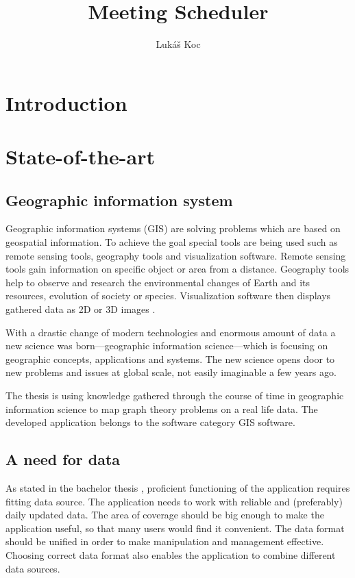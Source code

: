 \documentclass[thesis=M,english]{FITthesis}[2012/10/20]
\title{Meeting Scheduler}
\author{Luk{\' a}{\v s} Koc} %
\begin{document}

\chapter{Introduction}


\chapter{State-of-the-art}

\section{Geographic information system}
Geographic information systems (GIS) are solving problems which are based on geospatial information. To achieve the goal special tools are being used such as remote sensing tools, geography tools and visualization software. Remote sensing tools gain information on specific object or area from a distance. Geography tools help to observe and research the environmental changes of Earth and its resources, evolution of society or species. Visualization software then displays gathered data as 2D or 3D images \cite{Chen10}.

With a drastic change of modern technologies and enormous amount of data a new science was born---geographic information science---which is focusing on geographic concepts, applications and systems. The new science opens door to new problems and issues at global scale, not easily imaginable a few years ago. 

The thesis is using knowledge gathered through the course of time in geographic information science to map graph theory problems on a real life data. The developed application belongs to the software category GIS software. 

\section{A need for data}
\label{S1: Good data}
As stated in the bachelor thesis \cite{Koc14}, proficient functioning of the application requires fitting data source. The application needs to work with reliable and (preferably) daily updated data. The area of coverage should be big enough to make the application useful, so that many users would find it convenient. The data format should be unified in order to make manipulation and management effective. Choosing correct data format also enables the application to combine different data sources.
\end{document}
